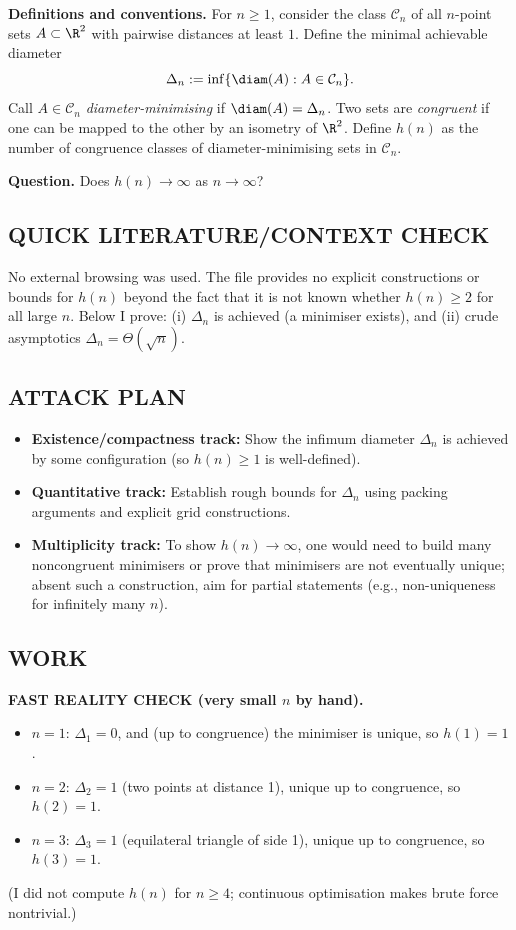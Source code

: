 \medskip
\noindent\textbf{Definitions and conventions.}
For $n\ge 1$, consider the class $\mathcal{C}_n$ of all $n$-point sets $A\subset\R^2$ with pairwise distances at least $1$.
Define the minimal achievable diameter
\[\Delta_n := \inf\{\diam(A): A\in\mathcal{C}_n\}.
\]
Call $A\in\mathcal{C}_n$ \emph{diameter-minimising} if $\diam(A)=\Delta_n$.
Two sets are \emph{congruent} if one can be mapped to the other by an isometry of $\R^2$.
Define $h(n)$ as the number of congruence classes of diameter-minimising sets in $\mathcal{C}_n$.

\medskip
\noindent\textbf{Question.}
Does $h(n)\to\infty$ as $n\to\infty$?

\subsection*{QUICK LITERATURE/CONTEXT CHECK}
No external browsing was used.
The file provides no explicit constructions or bounds for $h(n)$ beyond the fact that it is not known whether $h(n)\ge 2$ for all large $n$.
Below I prove: (i) $\Delta_n$ is achieved (a minimiser exists), and (ii) crude asymptotics $\Delta_n=\Theta(\sqrt{n})$.

\subsection*{ATTACK PLAN}
\begin{itemize}[leftmargin=2em]
\item \textbf{Existence/compactness track:} Show the infimum diameter $\Delta_n$ is achieved by some configuration (so $h(n)\ge 1$ is well-defined).
\item \textbf{Quantitative track:} Establish rough bounds for $\Delta_n$ using packing arguments and explicit grid constructions.
\item \textbf{Multiplicity track:} To show $h(n)\to\infty$, one would need to build many noncongruent minimisers or prove that minimisers are not eventually unique; absent such a construction, aim for partial statements (e.g., non-uniqueness for infinitely many $n$).
\end{itemize}

\subsection*{WORK}
\noindent\textbf{FAST REALITY CHECK (very small $n$ by hand).}
\begin{itemize}[leftmargin=2em]
\item $n=1$: $\Delta_1=0$, and (up to congruence) the minimiser is unique, so $h(1)=1$.
\item $n=2$: $\Delta_2=1$ (two points at distance 1), unique up to congruence, so $h(2)=1$.
\item $n=3$: $\Delta_3=1$ (equilateral triangle of side 1), unique up to congruence, so $h(3)=1$.
\end{itemize}
(I did not compute $h(n)$ for $n\ge 4$; continuous optimisation makes brute force nontrivial.)

